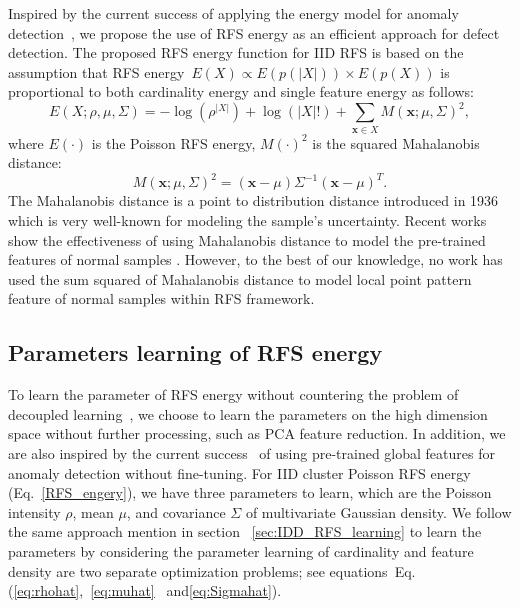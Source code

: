 \documentclass[journal]{IEEEtran}
\begin{document}
Inspired by the current success of applying the energy model for anomaly detection~\cite{zhai2016deep,grathwohl2019your,liu2020energy}, we propose the use of RFS energy as an efficient approach for defect detection.
The proposed RFS energy function for IID RFS is based on the assumption that RFS energy~$E(X) \propto E(p(|X|))\times E(p(X))$ is proportional to both cardinality energy and single feature energy as follows:
\begin{equation}
E(X;\rho,\mu,\Sigma)=-\log(\rho^{|X|})+\log(|X|!) +\sum_{\mathbf{x}\in X} M(\mathbf{x};\mu,\Sigma)^2,
\label{RFS_engery}
\end{equation}
where $E(\cdot)$ is the Poisson RFS energy, $M(\cdot)^2$ is the squared Mahalanobis distance:
\begin{equation}
M(\mathbf{x};\mu,\Sigma)^2=(\mathbf{x}-\mu)\Sigma^{-1}(\mathbf{x}-\mu)^T.
\label{Mah_dis}
\end{equation}
The Mahalanobis distance is a point to distribution distance introduced in 1936~\cite{mahalanobis1936generalized} which is very well-known for modeling the sample's uncertainty. Recent works show the effectiveness of using Mahalanobis distance to model the pre-trained features of normal samples \cite{christiansen2016deepanomaly,rippel2021modeling}. However, to the best of our knowledge, no work has used the sum squared of Mahalanobis distance to model local point pattern feature of normal samples within RFS framework.

\subsection{Parameters learning of RFS energy}
\label{Sec:RFS_energy_parameter_learning}
To learn the parameter of RFS energy without countering the problem of decoupled learning~\cite{zong2018deep}, we choose to learn the parameters on the high dimension space without further processing, such as PCA feature reduction. In addition, we are also inspired by the current success~\cite{lee2018simple,rippel2021modeling} of using pre-trained global features for anomaly detection without fine-tuning. For IID cluster Poisson RFS energy (Eq.~\ref{RFS_engery}), we have three parameters to learn, which are the Poisson intensity $\rho$, mean $\mu$, and covariance $\Sigma$ of multivariate Gaussian density. We follow the same approach mention in section ~\ref{sec:IDD_RFS_learning} to learn the parameters by considering the parameter learning of cardinality and feature density are two separate optimization problems; see equations~Eq. (\ref{eq:rhohat},~\ref{eq:muhat}~ and\ref{eq:Sigmahat}).
\end{document}
